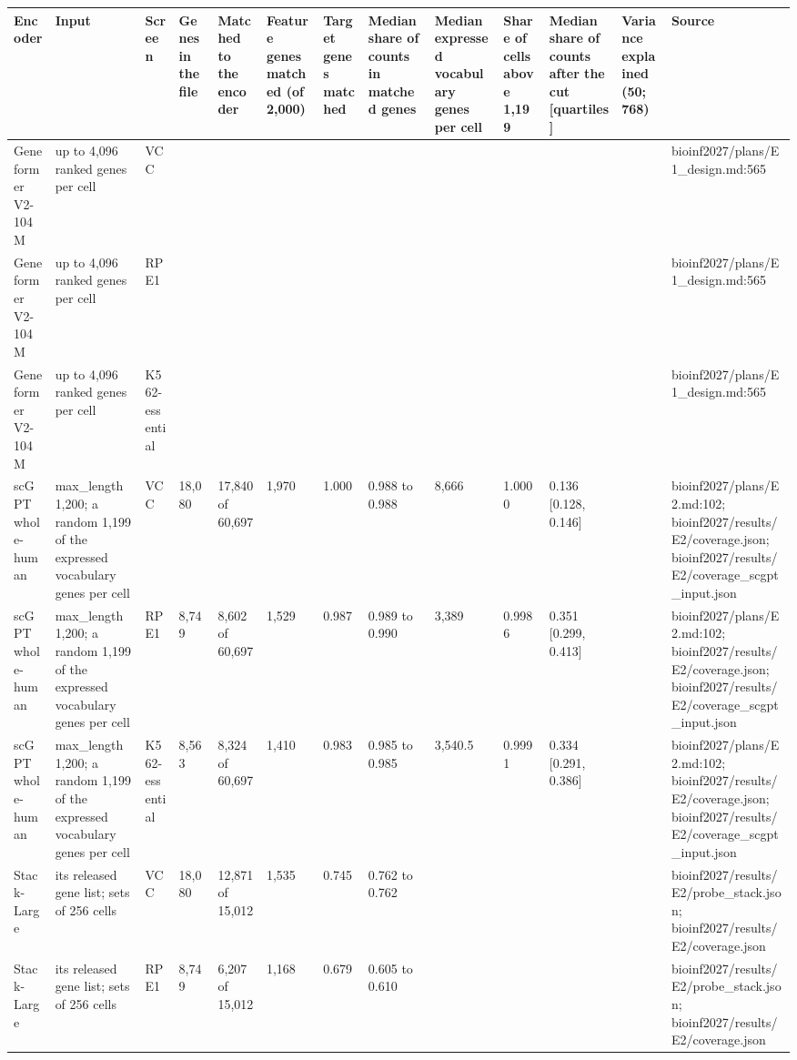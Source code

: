 \begin{tabular}{lllllllllllll}
\toprule
Encoder & Input & Screen & Genes in the file & Matched to the encoder & Feature genes matched (of 2,000) & Target genes matched & Median share of counts in matched genes & Median expressed vocabulary genes per cell & Share of cells above 1,199 & Median share of counts after the cut [quartiles] & Variance explained (50; 768) & Source \\
\midrule
Geneformer V2-104M & up to 4,096 ranked genes per cell & VCC &  &  &  &  &  &  &  &  &  & bioinf2027/plans/E1\_design.md:565 \\
Geneformer V2-104M & up to 4,096 ranked genes per cell & RPE1 &  &  &  &  &  &  &  &  &  & bioinf2027/plans/E1\_design.md:565 \\
Geneformer V2-104M & up to 4,096 ranked genes per cell & K562-essential &  &  &  &  &  &  &  &  &  & bioinf2027/plans/E1\_design.md:565 \\
scGPT whole-human & max\_length 1,200; a random 1,199 of the expressed vocabulary genes per cell & VCC & 18,080 & 17,840 of 60,697 & 1,970 & 1.000 & 0.988 to 0.988 & 8,666 & 1.0000 & 0.136 [0.128, 0.146] &  & bioinf2027/plans/E2.md:102; bioinf2027/results/E2/coverage.json; bioinf2027/results/E2/coverage\_scgpt\_input.json \\
scGPT whole-human & max\_length 1,200; a random 1,199 of the expressed vocabulary genes per cell & RPE1 & 8,749 & 8,602 of 60,697 & 1,529 & 0.987 & 0.989 to 0.990 & 3,389 & 0.9986 & 0.351 [0.299, 0.413] &  & bioinf2027/plans/E2.md:102; bioinf2027/results/E2/coverage.json; bioinf2027/results/E2/coverage\_scgpt\_input.json \\
scGPT whole-human & max\_length 1,200; a random 1,199 of the expressed vocabulary genes per cell & K562-essential & 8,563 & 8,324 of 60,697 & 1,410 & 0.983 & 0.985 to 0.985 & 3,540.5 & 0.9991 & 0.334 [0.291, 0.386] &  & bioinf2027/plans/E2.md:102; bioinf2027/results/E2/coverage.json; bioinf2027/results/E2/coverage\_scgpt\_input.json \\
Stack-Large & its released gene list; sets of 256 cells & VCC & 18,080 & 12,871 of 15,012 & 1,535 & 0.745 & 0.762 to 0.762 &  &  &  &  & bioinf2027/results/E2/probe\_stack.json; bioinf2027/results/E2/coverage.json \\
Stack-Large & its released gene list; sets of 256 cells & RPE1 & 8,749 & 6,207 of 15,012 & 1,168 & 0.679 & 0.605 to 0.610 &  &  &  &  & bioinf2027/results/E2/probe\_stack.json; bioinf2027/results/E2/coverage.json \\

\end{tabular}
